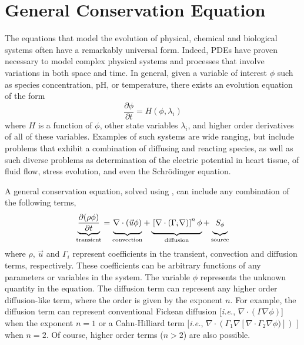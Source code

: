 \section{General Conservation Equation}
\label{sec:GeneralConservationEquation}

The equations that model the evolution of physical, chemical and
biological systems often have a remarkably universal form.  Indeed,
PDEs have proven necessary to model complex physical systems and
processes that involve variations in both space and time.  In general,
given a variable of interest \( \phi \) such as species concentration,
pH, or temperature, there exists an evolution equation of the form
\begin{equation}
  \frac{\partial \phi}{\partial t} = H(\phi, \lambda_i)
  \label{eqn:general-equation}
\end{equation}
where \( H \) is a function of \(\phi\), other state variables
\(\lambda_i\), and higher order derivatives of all of these variables.
Examples of such systems are wide ranging, but include problems that
exhibit a combination of diffusing and reacting species, as well as
such diverse problems as determination of the electric potential in
heart tissue, of fluid flow, stress evolution, and even the
Schr\"odinger equation.

A general conservation equation, solved using \FiPy{}, can include any
combination of the following terms,
\begin{equation}                        
  \underbrace{
  \frac{\partial (\rho \phi)}{\partial t}
  }_{\text{transient}}
=
\underbrace{
  \vphantom{\frac{\partial (\rho \phi)}{\partial t}}
  \nabla \cdot \left( \vec{u} \phi \right)
}_{\text{convection}}
+
\underbrace{
  \vphantom{\frac{\partial (\rho \phi)}{\partial t}}
  \left[ \nabla \cdot \left( \Gamma_i \nabla \right) \right]^n \phi
}_{\text{diffusion}}
+
\underbrace{
  \vphantom{\frac{\partial (\rho \phi)}{\partial t}}
  S_{\phi}
}_{\text{source}}
\label{eqn:num:gen}
\end{equation}
where $\rho$, $\vec{u}$ and $\Gamma_i$ represent coefficients in the
transient, convection and diffusion terms, respectively.  These
coefficients can be arbitrary functions of any parameters or variables
in the system.  The variable $\phi$ represents the unknown quantity in
the equation.  The diffusion term can represent any higher order
diffusion-like term, where the order is given by the exponent $n$.
For example, the diffusion term can represent conventional Fickean
diffusion [\emph{i.e.}, $\nabla\cdot(\Gamma\nabla\phi)$] when the
exponent $n = 1$ or a Cahn-Hilliard term [\emph{i.e.}, $\nabla \cdot (
\Gamma_1 \nabla [ \nabla \cdot \Gamma_2 \nabla \phi ) ] )$
\cite{CahnHilliardI,CahnHilliardII,CahnHilliardIII}] when $n =
2$.  Of course, higher order terms ($n > 2$) are also possible.



